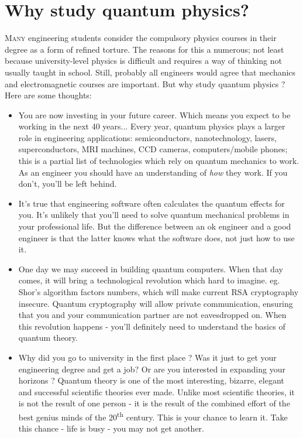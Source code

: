 \documentclass{Textbook}
\begin{document}
\pagebreak
\tableofcontents

\mainmatter
\setcounter{chapter}{-1}
\chapter{Why study quantum physics?}
\lettrine[lines=3,slope=6pt,nindent=6pt]{\initfamily M}{any} engineering students consider the compulsory physics courses in their degree as a form of refined torture. The reasons for this a numerous; not least because university-level physics is difficult and requires a way of thinking not usually taught in school. Still, probably all engineers would agree that mechanics and electromagnetic courses are important. But why study quantum physics ? Here are some thoughts:

\begin{itemize}
\item You are now investing in your future career. Which means you expect to be working in the next 40 years... Every year, quantum physics plays a larger role in engineering applications: semiconductors, nanotechnology, lasers, superconductors, MRI machines, CCD cameras, computers/mobile phones; this is a partial list of technologies which rely on quantum mechanics to work. As an engineer you should have an understanding of \emph{how} they work. If you don't, you'll be left behind.
\item It's true that engineering software often calculates the quantum effects for you. It's unlikely that you'll need to solve quantum mechanical problems in your professional life. But the difference between an ok engineer and a good engineer is that the latter knows what the software does, not just how to use it.
\item One day we may succeed in building quantum computers. When that day comes, it will bring a technological revolution which hard to imagine. eg. Shor's algorithm factors numbers, which will make current RSA cryptography insecure. Quantum cryptography will allow private communication, ensuring that you and your communication partner are not eavesdropped on. When this revolution happens - you'll definitely need to understand the basics of quantum theory.
\item Why did you go to university in the first place ? Was it just to get your engineering degree and get a job? Or are you interested in expanding your horizons ? Quantum theory is one of the most interesting, bizarre, elegant and successful scientific theories ever made. Unlike most scientific theories, it is not the result of one person - it is the result of the combined effort of the best genius minds of the 20\textsuperscript{th} century. This is your chance to learn it. Take this chance - life is busy - you may not get another.  
\end{itemize}
\end{document}
